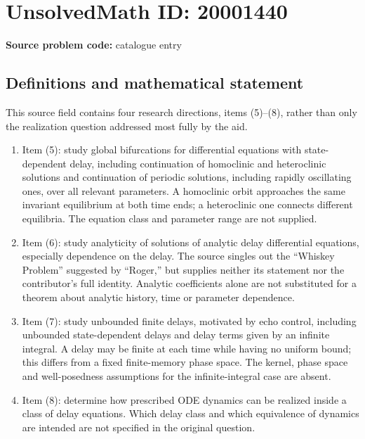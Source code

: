 \documentclass[11pt]{article}
\begin{document}
\section*{UnsolvedMath ID: 20001440}
\textbf{Source problem code:} catalogue entry
\subsection{Definitions and mathematical statement}
This source field contains four research directions, items (5)--(8), rather than only the realization question addressed most fully by the aid.
\begin{enumerate}
\item Item (5): study global bifurcations for differential equations with state-dependent delay, including continuation of homoclinic and heteroclinic solutions and continuation of periodic solutions, including rapidly oscillating ones, over all relevant parameters. A homoclinic orbit approaches the same invariant equilibrium at both time ends; a heteroclinic one connects different equilibria. The equation class and parameter range are not supplied.
\item Item (6): study analyticity of solutions of analytic delay differential equations, especially dependence on the delay. The source singles out the ``Whiskey Problem'' suggested by ``Roger,'' but supplies neither its statement nor the contributor's full identity. Analytic coefficients alone are not substituted for a theorem about analytic history, time or parameter dependence.
\item Item (7): study unbounded finite delays, motivated by echo control, including unbounded state-dependent delays and delay terms given by an infinite integral. A delay may be finite at each time while having no uniform bound; this differs from a fixed finite-memory phase space. The kernel, phase space and well-posedness assumptions for the infinite-integral case are absent.
\item Item (8): determine how prescribed ODE dynamics can be realized inside a class of delay equations. Which delay class and which equivalence of dynamics are intended are not specified in the original question.
\end{enumerate}
\end{document}
